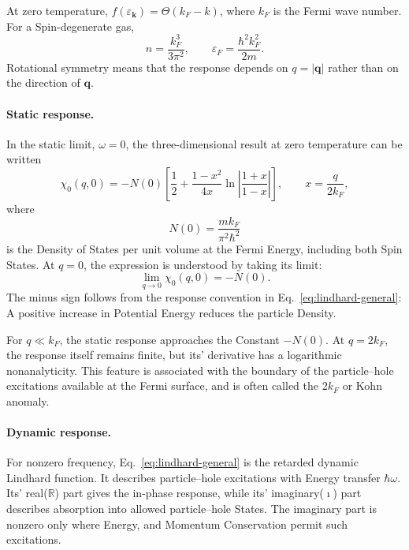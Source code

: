 \documentclass[a4paper, 10pt, onepage]{elegantbook}
\begin{document}
{At zero temperature, \(f(\varepsilon_{\mathbf k})=\Theta(k_F-k)\), where
\(k_F\) is the Fermi wave number. For a Spin-degenerate gas,
\begin{equation}
n=\frac{k_F^3}{3\pi^2},
\qquad
\varepsilon_F=\frac{\hbar^2 k_F^2}{2m}.
\label{eq:lindhard-Density}
\end{equation}
Rotational symmetry means that the response depends on \(q=|\mathbf q|\)
rather than on the direction of \(\mathbf q\).

\paragraph{Static response.}
In the static limit, \(\omega=0\), the three-dimensional result at zero
temperature can be written
\begin{equation}
\chi_0(q,0)
=
-N(0)\left[
\frac{1}{2}
+
\frac{1-x^2}{4x}
\ln\left|\frac{1+x}{1-x}\right|
\right],
\qquad
x=\frac{q}{2k_F},
\label{eq:lindhard-static}
\end{equation}
where
\begin{equation}
N(0)=\frac{m k_F}{\pi^2\hbar^2}
\label{eq:lindhard-dos}
\end{equation}
is the Density of States per unit volume at the Fermi Energy, including
both Spin States. At \(q=0\), the expression is understood by taking its
limit:
\begin{equation}
\lim_{q\to0}\chi_0(q,0)=-N(0).
\end{equation}
The minus sign follows from the response convention in
Eq.~\eqref{eq:lindhard-general}: A positive increase in Potential Energy
reduces the particle Density.

For \(q\ll k_F\), the static response approaches the Constant
\(-N(0)\). At \(q=2k_F\), the response itself remains finite, but its'
derivative has a logarithmic nonanalyticity. This feature is associated
with the boundary of the particle--hole excitations available at the
Fermi surface, and is often called the \(2k_F\) or Kohn anomaly.

\paragraph{Dynamic response.}
For nonzero frequency, Eq.~\eqref{eq:lindhard-general} is the retarded
dynamic Lindhard function. It describes particle--hole excitations with
Energy transfer \(\hbar\omega\). Its' real($\mathbb{R}$) part gives the in-phase
response, while its' imaginary($\imath$) part describes absorption into allowed
particle--hole States. The imaginary part is nonzero only where Energy,
and Momentum Conservation permit such excitations.

}
\end{document}
